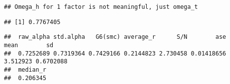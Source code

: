 \documentclass[
]{article}
\newenvironment{Shaded}{\begin{snugshade}}{\end{snugshade}}
\newcommand{\AttributeTok}[1]{\textcolor[rgb]{0.77,0.63,0.00}{#1}}
\newcommand{\ConstantTok}[1]{\textcolor[rgb]{0.00,0.00,0.00}{#1}}
\newcommand{\DecValTok}[1]{\textcolor[rgb]{0.00,0.00,0.81}{#1}}
\newcommand{\FunctionTok}[1]{\textcolor[rgb]{0.00,0.00,0.00}{#1}}
\newcommand{\NormalTok}[1]{#1}
\newcommand{\OtherTok}[1]{\textcolor[rgb]{0.56,0.35,0.01}{#1}}
\newcommand{\SpecialCharTok}[1]{\textcolor[rgb]{0.00,0.00,0.00}{#1}}
\begin{document}
\begin{verbatim}
## Omega_h for 1 factor is not meaningful, just omega_t
\end{verbatim}

\begin{Shaded}
\end{Shaded}

\begin{verbatim}
## [1] 0.7767405
\end{verbatim}

\begin{Shaded}
\end{Shaded}

\begin{verbatim}
##  raw_alpha std.alpha   G6(smc) average_r      S/N        ase     mean        sd
##  0.7252689 0.7319364 0.7429166 0.2144823 2.730458 0.01418656 3.512923 0.6702088
##  median_r
##  0.206345
\end{verbatim}

\begin{Shaded}
\end{Shaded}
\end{document}
